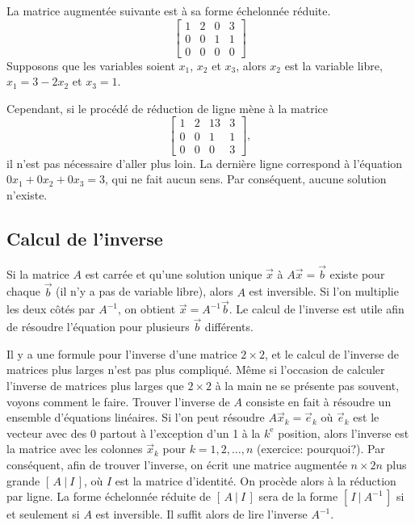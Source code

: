 \begin{example}
La matrice augmentée suivante est à sa forme échelonnée réduite.
\begin{equation*}
\left[
\begin{array}{ccc|c}
1 & 2 & 0 & 3 \\
0 & 0 & 1 & 1 \\
0 & 0 & 0 & 0
\end{array}
\right]
\end{equation*}
Supposons que les variables soient $x_1$, $x_2$ et $x_3$, alors $x_2$ est la variable libre, $x_1 = 3 - 2x_2$ et $x_3 = 1$.

\medskip

Cependant, si le procédé de réduction de ligne mène à la matrice
\begin{equation*}
\left[
\begin{array}{ccc|c}
1 & 2 & 13 & 3 \\
0 & 0 & 1 & 1 \\
0 & 0 & 0 & 3
\end{array}
\right]
,
\end{equation*}
il n’est pas nécessaire d’aller plus loin. La dernière ligne correspond à l'équation $0 x_1 + 0 x_2 + 0 x_3 = 3$, qui ne fait aucun sens. Par conséquent, aucune solution n’existe.
\end{example}

\subsection{Calcul de l'inverse}

Si la matrice $A$ est carrée et qu’une solution unique
$\vec{x}$ à $A \vec{x} = \vec{b}$ existe pour chaque $\vec{b}$ (il n’y a pas de variable libre), alors $A$ est inversible.
Si l'on multiplie les deux côtés par $A^{-1}$, on obtient $\vec{x} =
A^{-1} \vec{b}$.  Le calcul de l’inverse est utile afin de résoudre l’équation pour plusieurs $\vec{b}$ différents.

Il y a une formule pour l’inverse d’une matrice $2 \times 2$, et le calcul de l’inverse de matrices plus larges n’est pas plus compliqué. Même si l’occasion de calculer l’inverse de matrices plus larges que $2 \times 2$ à la main ne se présente pas souvent, voyons comment le faire. Trouver l'inverse de $A$ consiste en fait à résoudre un ensemble d'équations linéaires. Si l'on peut résoudre $A \vec{x}_k = \vec{e}_k$ où $\vec{e}_k$  est le vecteur avec des 0 partout à l’exception d’un 1 à la $k^{\text{e}}$ position, alors l'inverse est la matrice avec les colonnes $\vec{x}_k$ pour $k=1,2,\ldots,n$
(exercice: pourquoi?).  Par conséquent, afin de trouver l’inverse, on écrit une matrice augmentée $n
\times 2n$ plus grande $[ \,A ~|~ I\, ]$, où $I$ est la matrice d'identité. On procède alors à la réduction par ligne. La forme échelonnée réduite de $[ \,A ~|~ I\, ]$ 
sera de la forme $[ \,I ~|~ A^{-1}\, ]$ si et seulement si
$A$ est inversible. Il suffit alors de lire l’inverse $A^{-1}$.

